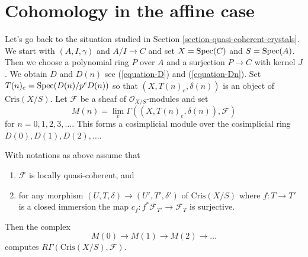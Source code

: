 \section{Cohomology in the affine case}
\label{section-cohomology-affine}

\noindent
Let's go back to the situation studied in
Section \ref{section-quasi-coherent-crystals}. We
start with $(A, I, \gamma)$ and $A/I \to C$ and set
$X = \mathop{\mathrm{Spec}}(C)$ and $S = \mathop{\mathrm{Spec}}(A)$. Then we choose
a polynomial ring $P$ over $A$ and a surjection $P \to C$ with
kernel $J$. We obtain $D$ and $D(n)$ see
(\ref{equation-D}) and (\ref{equation-Dn}).
Set $T(n)_e = \mathop{\mathrm{Spec}}(D(n)/p^eD(n))$ so that
$(X, T(n)_e, \delta(n))$ is an object of $\text{Cris}(X/S)$.
Let $\mathcal{F}$ be a sheaf of $\mathcal{O}_{X/S}$-modules and set
$$
M(n) = \lim_e \Gamma((X, T(n)_e, \delta(n)), \mathcal{F})
$$
for $n = 0, 1, 2, 3, \ldots$. This forms a cosimplicial module
over the cosimplicial ring $D(0), D(1), D(2), \ldots$.

\begin{proposition}
\label{proposition-compute-cohomology}
With notations as above assume that
\begin{enumerate}
\item $\mathcal{F}$ is locally quasi-coherent, and
\item for any morphism $(U, T, \delta) \to (U', T', \delta')$
of $\text{Cris}(X/S)$ where $f : T \to T'$ is a closed immersion
the map $c_f : f^*\mathcal{F}_{T'} \to \mathcal{F}_T$ is surjective.
\end{enumerate}
Then the complex
$$
M(0) \to M(1) \to M(2) \to \ldots
$$
computes $R\Gamma(\text{Cris}(X/S), \mathcal{F})$.
\end{proposition}


